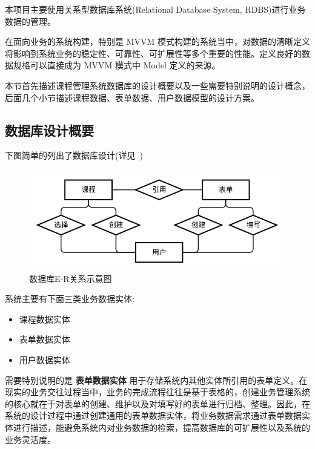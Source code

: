 本项目主要使用关系型数据库系统(Relational Database System, RDBS)进行业务数据的管理。

在面向业务的系统构建，特别是 MVVM 模式构建的系统当中，对数据的清晰定义将影响到系统业务的稳定性、可靠性、可扩展性等多个重要的性能。定义良好的数据规格可以直接成为 MVVM 模式中 Model 定义的来源。

本节首先描述课程管理系统数据库的设计概要以及一些需要特别说明的设计概念，后面几个小节描述课程数据、表单数据、用户数据模型的设计方案。

\newpage

\subsection{数据库设计概要}

下图简单的列出了数据库设计(详见~)

\begin{figure}[!h]
  \begin{center}
    \includegraphics[scale=0.5]{figures/diagram-er-overview.png}
    \caption{数据库E-R关系示意图\label{DatabaseOverview}}
  \end{center}
\end{figure}

系统主要有下面三类业务数据实体:

\begin{itemize}
  \item 课程数据实体
  \item 表单数据实体
  \item 用户数据实体
\end{itemize}

需要特别说明的是 \textbf{表单数据实体} 用于存储系统内其他实体所引用的表单定义。在现实的业务交往过程当中，业务的完成流程往往是基于表格的，创建业务管理系统的核心就在于对表单的创建、维护以及对填写好的表单进行归档、整理。因此，在系统的设计过程中通过创建通用的表单数据实体，将业务数据需求通过表单数据实体进行描述，能避免系统内对业务数据的检索，提高数据库的可扩展性以及系统的业务灵活度。


